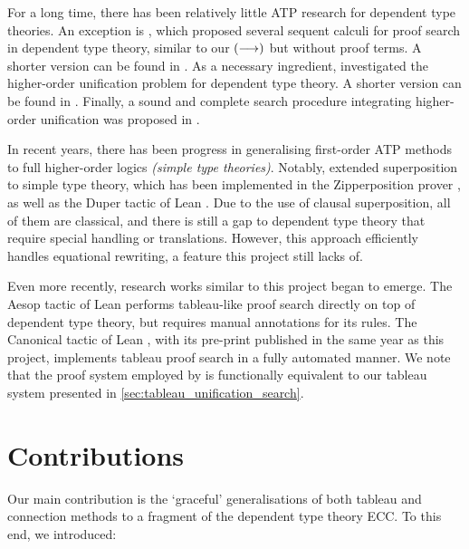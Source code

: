\documentclass[twoside]{report}
\begin{document}
For a long time, there has been relatively little ATP research for dependent type theories. An exception is \cite{pym1990proofs}, which proposed several sequent calculi for proof search in dependent type theory, similar to our $(\longrightarrow)$ but without proof terms. A shorter version can be found in \cite{pym1990investigations}. As a necessary ingredient, \cite{elliott1990extensions} investigated the higher-order unification problem for dependent type theory. A shorter version can be found in \cite{elliott1989higher}. Finally, a sound and complete search procedure integrating higher-order unification was proposed in \cite{dowek1993complete}.

In recent years, there has been progress in generalising first-order ATP methods to full higher-order logics \emph{(simple type theories)}. Notably, \cite{bentkamp2021superposition,vukmirovic2021making} extended superposition to simple type theory, which has been implemented in the Zipperposition prover \cite{cruanes2014logtk}, as well as the Duper tactic of Lean \cite{clune2024duper}. Due to the use of clausal superposition, all of them are classical, and there is still a gap to dependent type theory that require special handling or translations. However, this approach efficiently handles equational rewriting, a feature this project still lacks of.

Even more recently, research works similar to this project began to emerge. The Aesop tactic of Lean \cite{limperg2023aesop} performs tableau-like proof search directly on top of dependent type theory, but requires manual annotations for its rules. The Canonical tactic of Lean \cite{norman2025canonical}, with its pre-print published in the same year as this project, implements tableau proof search in a fully automated manner. We note that the proof system employed by \cite{norman2025canonical} is functionally equivalent to our tableau system presented in \cref{sec:tableau_unification_search}.

\section{Contributions}
\label{sec:contributions}

Our main contribution is the `graceful' generalisations of both tableau and connection methods to a fragment of the dependent type theory ECC. To this end, we introduced:
\end{document}

